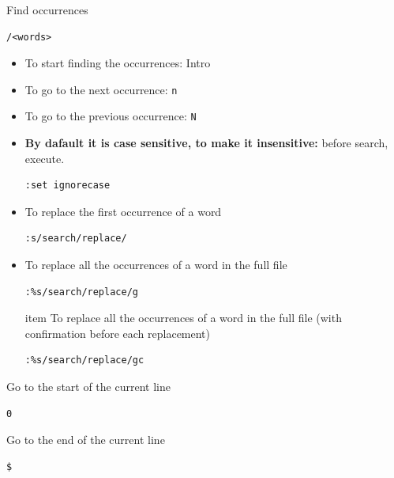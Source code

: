 \documentclass{article}
\newenvironment{codetemplate}[1][]{%
  \mybasecolorbox[#1]
  \itshape
}{%
  \endmybasecolorbox
}
\begin{document}
Find occurrences
\begin{codetemplate}
\begin{verbatim}
/<words>
\end{verbatim}
\end{codetemplate}
\begin{itemize}
    \item To start finding the occurrences: Intro
    \item To go to the next occurrence: \verb|n|
    \item To go to the previous occurrence: \verb|N|
    \item \textbf{By dafault it is case sensitive, to make it insensitive:} before search, execute.
\begin{codetemplate}
\begin{verbatim}
:set ignorecase
\end{verbatim}
\end{codetemplate}
    \item To replace the first occurrence of a word
\begin{codetemplate}
\begin{verbatim}
:s/search/replace/
\end{verbatim}
\end{codetemplate}
    \item To replace all the occurrences of a word in the full file
\begin{codetemplate}
\begin{verbatim}
:%s/search/replace/g
\end{verbatim}
\end{codetemplate}
    item To replace all the occurrences of a word in the full file (with confirmation before each replacement)
\begin{codetemplate}
\begin{verbatim}
:%s/search/replace/gc
\end{verbatim}
\end{codetemplate}
\end{itemize}

Go to the start of the current line
\begin{codetemplate}
\begin{verbatim}
0
\end{verbatim}
\end{codetemplate}

Go to the end of the current line
\begin{codetemplate}
\begin{verbatim}
$
\end{verbatim}
\end{codetemplate}
\end{document}
